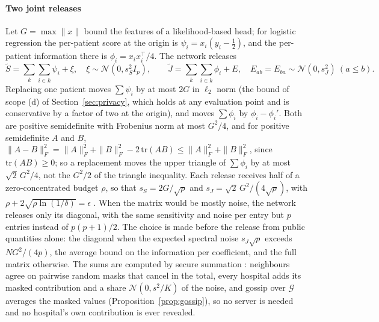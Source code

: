 \documentclass[acmsmall,screen,review]{acmart}
\theoremstyle{acmdefinition}
\begin{document}
\paragraph{Two joint releases} Let $G=\max\|x\|$ bound the features of a likelihood-based head; for logistic regression the per-patient score at the origin is $\psi_i=x_i(y_i-\tfrac12)$, and the per-patient information there is $\phi_i=x_ix_i^{\top}/4$. The network releases
\[
\tilde{S}=\sum_{k}\sum_{i\in k}\psi_i+\xi,\quad \xi\sim\mathcal{N}(0,s_S^2I_p),\qquad
\tilde{J}=\sum_{k}\sum_{i\in k}\phi_i+E,\quad E_{ab}=E_{ba}\sim\mathcal{N}(0,s_J^2)\ (a\le b).
\]
Replacing one patient moves $\sum\psi_i$ by at most $2G$ in $\ell_2$ norm (the bound of scope (d) of Section~\ref{sec:privacy}, which holds at any evaluation point and is conservative by a factor of two at the origin), and moves $\sum\phi_i$ by $\phi_i-\phi_i'$. Both are positive semidefinite with Frobenius norm at most $G^2/4$, and for positive semidefinite $A$ and $B$, $\|A-B\|_F^2=\|A\|_F^2+\|B\|_F^2-2\,\mathrm{tr}(AB)\le\|A\|_F^2+\|B\|_F^2$, since $\mathrm{tr}(AB)\ge0$; so a replacement moves the upper triangle of $\sum\phi_i$ by at most $\sqrt2\,G^2/4$, not the $G^2/2$ of the triangle inequality. Each release receives half of a zero-concentrated budget $\rho$, so that $s_S=2G/\sqrt{\rho}$ and $s_J=\sqrt2\,G^2/(4\sqrt{\rho})$, with $\rho+2\sqrt{\rho\ln(1/\delta)}=\epsilon$ \cite{bun2016concentrated}. When the matrix would be mostly noise, the network releases only its diagonal, with the same sensitivity and noise per entry but $p$ entries instead of $p(p+1)/2$. The choice is made before the release from public quantities alone: the diagonal when the expected spectral noise $s_J\sqrt{p}$ exceeds $NG^2/(4p)$, the average bound on the information per coefficient, and the full matrix otherwise. The sums are computed by secure summation \cite{bonawitz2017practical}: neighbours agree on pairwise random masks that cancel in the total, every hospital adds its masked contribution and a share $\mathcal{N}(0,s^2/K)$ of the noise, and gossip over $\mathcal{G}$ averages the masked values (Proposition~\ref{prop:gossip}), so no server is needed and no hospital's own contribution is ever revealed.
\end{document}

